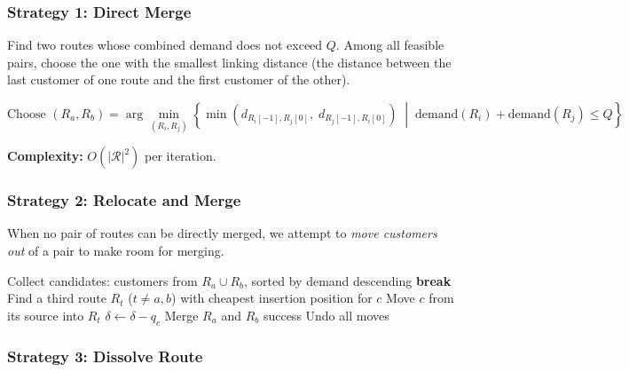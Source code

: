 \documentclass[12pt,a4paper]{article}
\theoremstyle{definition}
\begin{document}
\subsubsection{Strategy 1: Direct Merge}

Find two routes whose combined demand does not exceed $Q$. Among all feasible pairs, choose the one with the smallest linking distance (the distance between the last customer of one route and the first customer of the other).

\begin{equation}
\text{Choose } (R_a, R_b) = \arg\min_{(R_i, R_j)} \left\{ \min\left( d_{R_i[-1], R_j[0]},\; d_{R_j[-1], R_i[0]} \right) \;\middle|\; \text{demand}(R_i) + \text{demand}(R_j) \leq Q \right\}
\end{equation}

\textbf{Complexity:} $O(|\mathcal{R}|^2)$ per iteration.

\subsubsection{Strategy 2: Relocate and Merge}

When no pair of routes can be directly merged, we attempt to \emph{move customers out} of a pair to make room for merging.

\begin{algorithm}[H]
\caption{Strategy 2: Relocate and Merge}
\begin{algorithmic}[1]
    \State Collect candidates: customers from $R_a \cup R_b$, sorted by demand descending
         \textbf{break} \EndIf
        \State Find a third route $R_t$ ($t \neq a, b$) with cheapest insertion position for $c$
            \State Move $c$ from its source into $R_t$
            \State $\delta \gets \delta - q_c$
        \EndIf
    \EndFor
        \State Merge $R_a$ and $R_b$
        \State \Return success
    \Else
        \State Undo all moves
    \EndIf
\EndFor
\end{algorithmic}
\end{algorithm}

\subsubsection{Strategy 3: Dissolve Route}
\end{document}
